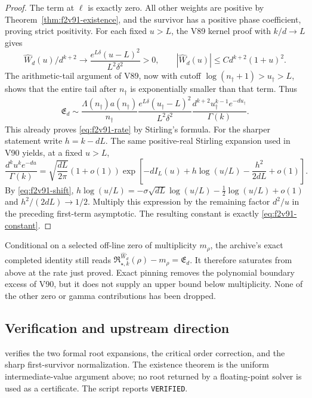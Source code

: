 \documentclass[11pt]{article}
\theoremstyle{definition}
\theoremstyle{remark}
\begin{document}
\begin{proof}
The term at \(\ell\) is exactly zero.  All other weights are
positive by Theorem~\ref{thm:f2v91-existence}, and the survivor has
a positive phase coefficient, proving strict positivity.
For each fixed \(u>L\), the V89 kernel proof with \(k/d\to L\)
gives
\[
 \widehat W_d(u)/d^{k+2}\longrightarrow
 \frac{e^{L\delta}(u-L)^2}{L^2\delta^2}>0,
 \qquad |\widehat W_d(u)|\le C d^{k+2}(1+u)^2.
\]
The arithmetic-tail argument of V89, now with cutoff
\(\log(n_\dagger+1)>u_\dagger>L\), shows that the entire tail
after \(n_\dagger\) is exponentially smaller than that term.  Thus
\[
 \mathfrak E_d\sim
 \frac{\Lambda(n_\dagger)a(n_\dagger)}{n_\dagger}
 \frac{e^{L\delta}(u_\dagger-L)^2}{L^2\delta^2}
 \frac{d^{k+2}u_\dagger^{k-1}e^{-du_\dagger}}{\Gamma(k)}.
\]
This already proves \eqref{eq:f2v91-rate} by Stirling's formula.
For the sharper statement write \(h=k-dL\).  The same positive-real
Stirling expansion used in V90 yields, at a fixed \(u>L\),
\[
 \frac{d^ku^ke^{-du}}{\Gamma(k)}
 =\sqrt{\frac{dL}{2\pi}}(1+o(1))
 \exp\left[-dI_L(u)+h\log(u/L)-\frac{h^2}{2dL}+o(1)\right].
\]
By \eqref{eq:f2v91-shift},
\(h\log(u/L)=-\sigma\sqrt{dL}\log(u/L)-\frac12\log(u/L)+o(1)\)
and \(h^2/(2dL)\to1/2\).  Multiply this expression by the
remaining factor \(d^2/u\) in the preceding first-term asymptotic.
The resulting constant is exactly \eqref{eq:f2v91-constant}.
\end{proof}

Conditional on a selected off-line zero of multiplicity \(m_\rho\),
the archive's exact completed identity still reads
\(\mathfrak R_{\star,k}^{\widehat W_d}(\rho)-m_\rho
=\mathfrak E_d\).  It therefore saturates from above at the rate just
proved.  Exact pinning removes the polynomial boundary excess of V90,
but it does not supply an upper bound below multiplicity.  None of the
other zero or gamma contributions has been dropped.

\subsection*{Verification and upstream direction}

 verifies the two
formal root expansions, the critical order correction, and the sharp
first-survivor normalization.  The existence theorem is the uniform
intermediate-value argument above; no root returned by a floating-point
solver is used as a certificate.  The script reports \texttt{VERIFIED}.
\end{document}
